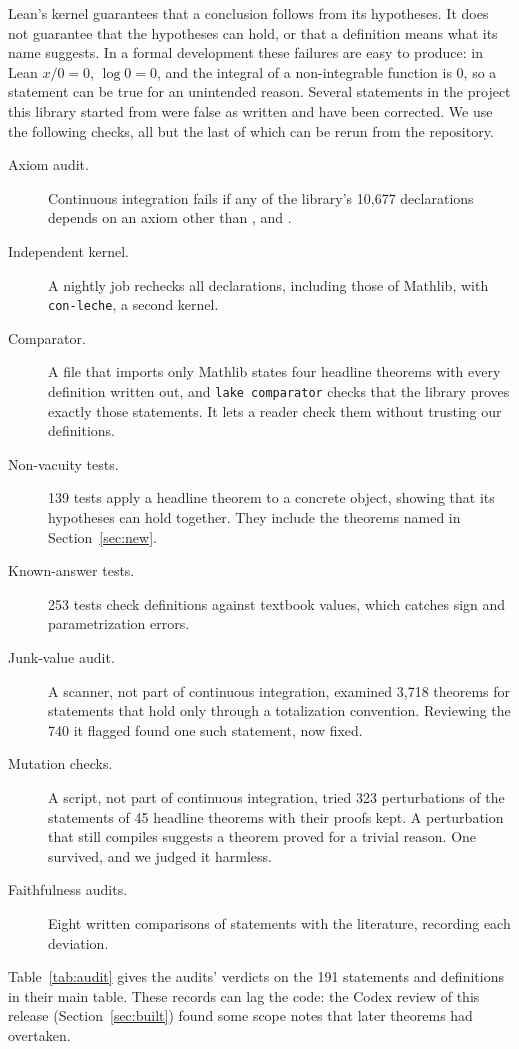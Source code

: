 \documentclass[11pt]{article}
\newcommand{\lean}[1]{\texttt{\detokenize{#1}}}
\begin{document}
Lean's kernel guarantees that a conclusion follows from its hypotheses. It does not guarantee that the
hypotheses can hold, or that a definition means what its name suggests. In a formal development these
failures are easy to produce: in Lean $x/0=0$, $\log 0=0$, and the integral of a non-integrable
function is $0$, so a statement can be true for an unintended reason. Several statements in the
project this library started from were false as written and have been corrected. We use the following
checks, all but the last of which can be rerun from the repository.
\begin{description}
  \item[Axiom audit.] Continuous integration fails if any of the library's 10,677 declarations depends on an
    axiom other than \lean{propext}, \lean{Classical.choice} and \lean{Quot.sound}.
  \item[Independent kernel.] A nightly job rechecks all declarations, including those of
    Mathlib, with \texttt{con-leche}, a second kernel.
  \item[Comparator.] A file that imports only Mathlib states four headline theorems with every definition written out, and \texttt{lake comparator} checks that the library proves exactly those statements. It lets a reader check them without trusting our definitions.
  \item[Non-vacuity tests.] 139 tests apply a headline theorem to a concrete object, showing that its
    hypotheses can hold together. They include the theorems named in Section~\ref{sec:new}.
  \item[Known-answer tests.] 253 tests check definitions against textbook values, which catches sign
    and parametrization errors.
  \item[Junk-value audit.] A scanner, not part of continuous integration, examined 3,718 theorems for statements that hold only through a
    totalization convention. Reviewing the 740 it flagged found one such statement, now fixed.
  \item[Mutation checks.] A script, not part of continuous integration, tried 323 perturbations of the statements of 45 headline theorems with their proofs kept.
    A perturbation that still compiles suggests a theorem proved for a trivial reason. One survived, and we
    judged it harmless.
  \item[Faithfulness audits.] Eight written comparisons of statements with the literature, recording each deviation.
\end{description}
Table~\ref{tab:audit} gives the audits' verdicts on the 191 statements and definitions in their main table. These records can lag the code: the Codex review of this release (Section~\ref{sec:built}) found some scope notes that later theorems had overtaken.
\end{document}
